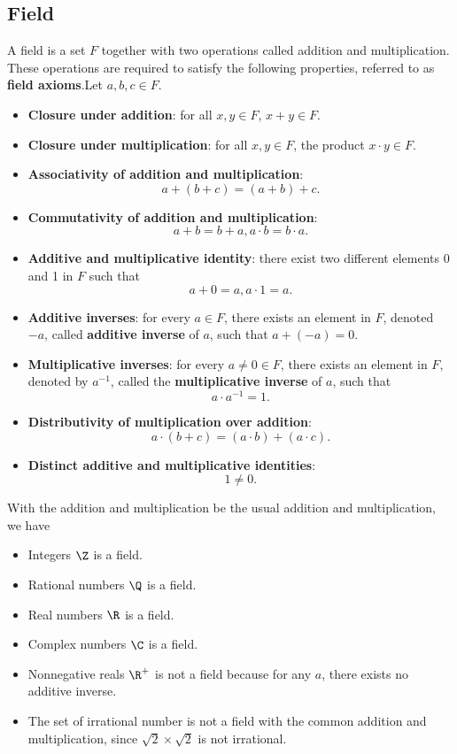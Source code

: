 \begin{refsection}
\subsection{Field}
\begin{definition}[field]
A field is a set $F$ together with two operations called addition and multiplication.	These operations are required to satisfy the following properties, referred to as \textbf{field axioms}.Let $a,b,c \in F$.
\begin{itemize}
	\item \textbf{Closure under addition}: for all $x,y\in F$, $x+y\in F$.
	\item \textbf{Closure under multiplication}: for all $x,y\in F$, the product $x\cdot y\in F$.
	\item \textbf{Associativity of addition and multiplication}:
	$$a + (b+c) = (a+b) + c.$$
	\item \textbf{Commutativity of addition and multiplication}: 
	$$a+b = b+a, a\cdot b = b\cdot a.$$
	\item \textbf{Additive and multiplicative identity}: there exist two different elements 0 and 1 in $F$ such that 
	$$a + 0 = a, a\cdot 1 = a.$$
	\item \textbf{Additive inverses}: for every $a\in F$, there exists an element in $F$, denoted $−a$, called \textbf{additive inverse} of $a$, such that $a + (-a) = 0$.
	\item \textbf{Multiplicative inverses}: for every $a\neq 0 \in F$, there exists an element in $F$, denoted by $a^{-1}$, called the \textbf{multiplicative inverse} of $a$, such that $$a\cdot a^{-1} = 1.$$
	\item \textbf{Distributivity of multiplication over addition}: 
	$$a\cdot (b+c) = (a\cdot b)+(a\cdot c).$$
	\item \textbf{Distinct additive and multiplicative identities}: $$1\neq 0.$$
\end{itemize}
\end{definition}

\begin{example}
With the addition and multiplication be the usual addition and multiplication, we have 
\begin{itemize}
	\item Integers $\Z$ is a field.
	\item Rational numbers $\Q$ is a field.
	\item Real numbers $\R$ is a field.
	\item Complex numbers $\C$ is a field.
	\item Nonnegative reals $\R^+$ is not a field because for any $a$, there exists no additive inverse.
	\item The set of irrational number is not a field with the common addition and multiplication, since $\sqrt{2}\times \sqrt{2}$ is not irrational. 
\end{itemize}		
\end{example}





\end{refsection}
